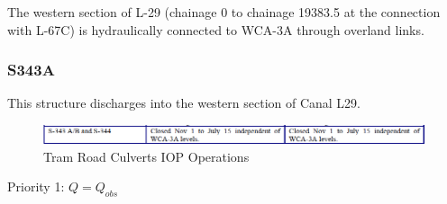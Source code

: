 The western section of L-29 (chainage 0 to chainage 19383.5 at the connection with L-67C) is hydraulically connected to WCA-3A through overland links.

\subsubsection{S343A}

This structure discharges into the western section of Canal L29.

\begin{figure}[!h]
  \begin{center}
  \includegraphics[width=6.5in]{../figs/S343-S344_IOPops.png}
  \caption{Tram Road Culverts IOP Operations}
  \label{fig:343iop}
  \end{center}
\end{figure}


\begin{packed_items}
\item Priority 1: $Q = Q_{obs}$
\end{packed_items}

%
%
%

